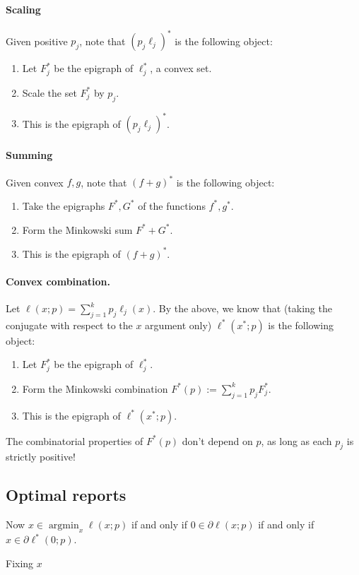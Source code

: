 \documentclass[12pt]{article}
\DeclareMathOperator*{\argmin}{\textrm{argmin}}
\begin{document}
\paragraph{Scaling}
Given positive $p_j$, note that $(p_j \ell_j)^*$ is the following object:
\begin{enumerate}
  \item Let $F_j^*$ be the epigraph of $\ell_j^*$, a convex set.
  \item Scale the set $F_j^*$ by $p_j$.
  \item This is the epigraph of $(p_j \ell_j)^*$.
\end{enumerate}

\paragraph{Summing}
Given convex $f,g$, note that $(f+g)^*$ is the following object:
\begin{enumerate}
  \item Take the epigraphs $F^*,G^*$ of the functions $f^*,g^*$.
  \item Form the Minkowski sum $F^* + G^*$.
  \item This is the epigraph of $(f+g)^*$.
\end{enumerate}

\paragraph{Convex combination.}
Let $\ell(x;p) = \sum_{j=1}^k p_j \ell_j(x)$.
By the above, we know that (taking the conjugate with respect to the $x$ argument only) $\ell^*(x^*;p)$ is the following object:
\begin{enumerate}
  \item Let $F_j^*$ be the epigraph of $\ell_j^*$.
  \item Form the Minkowski combination $F^*(p) := \sum_{j=1}^k p_j F_j^*$.
  \item This is the epigraph of $\ell^*(x^*;p)$.
\end{enumerate}
The combinatorial properties of $F^*(p)$ don't depend on $p$, as long as each $p_j$ is strictly positive!



\subsection{Optimal reports}
Now $x \in \argmin_x \ell(x;p)$ if and only if $0 \in \partial \ell(x;p)$ if and only if $x \in \partial \ell^*(0 ; p)$.

Fixing $x$
\end{document}
